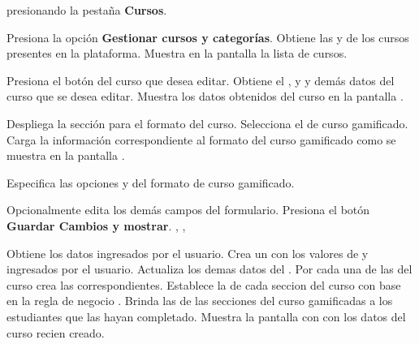 \begin{UCtrayectoria}%
%
  presionando la pestaña {\bf Cursos}.

  \Actor Presiona la opción {\bf Gestionar cursos y categorías}.
  \Sistema Obtiene las  y
            de los cursos presentes en la plataforma.
  \Sistema Muestra en la pantalla  la lista de cursos.
           \label{CU-E05-course-list}

  \Actor Presiona el botón \IUConfigurar del curso que desea editar.
  \Sistema Obtiene el ,  y
            y demás datos del curso que se desea editar.
  \Sistema Muestra los datos obtenidos del curso en la pantalla .


  \Actor Despliega la sección para el formato del curso.
  \Actor Selecciona el  de curso gamificado.
  \Sistema Carga la información correspondiente al formato del curso gamificado
           como se muestra en la pantalla .

  \Actor Especifica las opciones  y
          del formato de curso gamificado. 

  \Actor Opcionalmente edita los demás campos del formulario.
  \Actor Presiona el botón {\bf Guardar Cambios y mostrar}. , ,
          \label{CU-E05-submit}

  \Sistema Obtiene los datos ingresados por el usuario.
  \Sistema Crea un  con los valores de  
           y  ingresados por el usuario.
  \Sistema Actualiza los demas datos del .
  \Sistema Por cada una de las  del curso crea las
            correspondientes.
  \Sistema Establece la  de cada seccion del curso con base
           en la regla de negocio .
  \Sistema Brinda las  de las secciones del curso
           gamificadas a los estudiantes que las hayan completado. \label{CU-E05-finish}
  \Sistema Muestra la pantalla con  con los datos del curso recien
           creado.

\end{UCtrayectoria}

